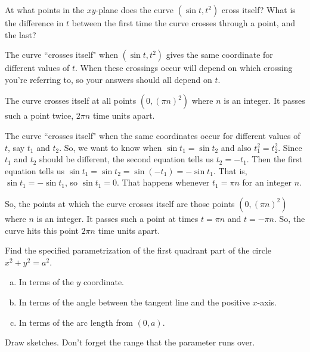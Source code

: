 \begin{question}
At what points in the $xy$-plane does the curve $(\sin t, t^2)$ cross itself? What is the difference in $t$ between the first time the curve crosses through a point, and the last?
\end{question}
\begin{hint}
The curve ``crosses itself" when $(\sin t,t^2)$ gives the same coordinate for different values of $t$. When these crossings occur will depend on which crossing you're referring to, so your answers should all depend on $t$.
\end{hint}
\begin{answer}
The curve crosses itself at all points $(0,(\pi n)^2)$ where $n$ is an integer. It passes such a point twice, $2\pi n$ time units apart.
\end{answer}
\begin{solution}
The curve ``crosses itself" when the same coordinates occur for different values of $t$, say $t_1$ and $t_2$. So, we want to know when $\sin t_1=\sin t_2$ and also $t_1^2=t_2^2$. Since $t_1$ and $t_2$ should be different, the second equation tells us $t_2=-t_1$. Then the first equation tells us $\sin t_1=\sin t_2=\sin(-t_1)=-\sin t_1$. That is, $\sin t_1 = -\sin t_1$, so $\sin t_1=0$. That happens whenever $t_1=\pi n$ for an integer $n$.

So, the points at which the curve crosses itself are those points $(0,(\pi n)^2)$ where $n$ is an integer. It passes such a point at times $t=\pi n $ and $t=-\pi n$. So, the curve hits this point $2\pi n$ time units apart.
\end{solution}

\begin{question}
Find the specified parametrization of the first quadrant part
of the circle $x^2+y^2=a^2$.
\begin{enumerate}[(a)]
\item 
  In terms of the $y$ coordinate.
\item
  In terms of the angle between the tangent line and the 
  positive $x$-axis.
\item
  In terms of the arc length from $(0,a)$.
\end{enumerate}
\end{question}

\begin{hint} 
Draw sketches. Don't forget the range that the parameter runs over.
\end{hint}

